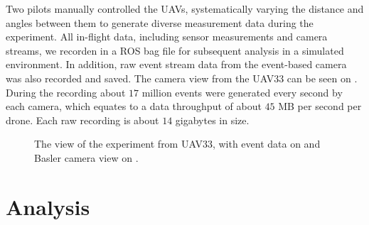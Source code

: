 Two pilots manually controlled the \ac{UAV}s, systematically varying the distance and angles between them to generate diverse measurement data during the experiment. All in-flight data, including sensor measurements and camera streams, we recorden in a \ac{ROS} bag file for subsequent analysis
in a simulated environment. In addition, raw event stream data from the event-based camera was also recorded and saved. The camera view from the UAV33
can be seen on . During the recording about $17$ million events were generated every second by each camera, which equates to a data
throughput of about $45$ MB per second per drone. Each raw recording is about $14$ gigabytes in size.

\begin{figure}[H]
	\centering
	\caption{
		The view of the experiment from UAV33, with event data on  and Basler camera view on .
  }
	\label{fig:exp1}
\end{figure}




\section{Analysis}

